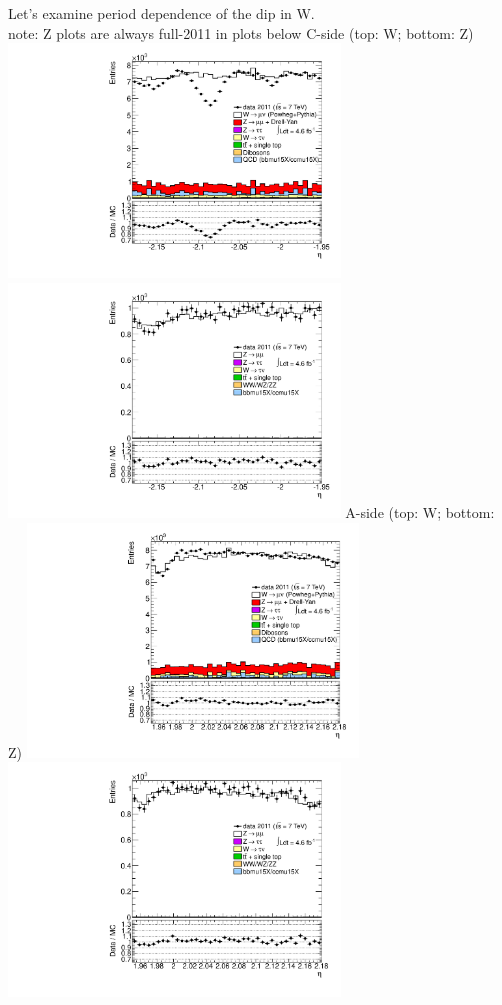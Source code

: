  {
Let's examine period dependence of the dip in W. \\
\small{ note: Z plots are always full-2011 in plots below }
}
 {
\colb[T]
C-side (top: W; bottom: Z)
\centering
\includegraphics[width=0.66\textwidth]{dates/20130306/figures/both/W_10_C_stack_l_eta_NEG} \\
\includegraphics[width=0.66\textwidth]{dates/20130306/figures/both/Z_10_C_stack_lN_eta_ALL.pdf}
A-side (top: W; bottom: Z)
\centering
\includegraphics[width=0.66\textwidth]{dates/20130306/figures/both/W_10_A_stack_l_eta_NEG} \\
\includegraphics[width=0.66\textwidth]{dates/20130306/figures/both/Z_10_A_stack_lN_eta_ALL.pdf} 
\cole
}

